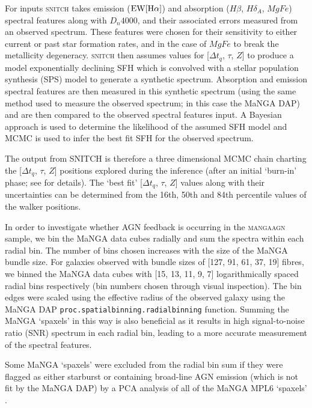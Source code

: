 \documentclass[useAMS,usenatbib]{mn2e}
\begin{document}
For inputs \textsc{snitch} takes emission ($\rm{EW}[H\alpha]$) and absorption ($H\beta$, $H\delta_A$, $MgFe$) spectral features along with $D_n4000$, and their associated errors measured from an observed spectrum. These features were chosen for their sensitivity to either current or past star formation rates, and in the case of $MgFe$ to break the metallicity degeneracy. \textsc{snitch} then assumes values for [$\Delta t_q$, $\tau$, $Z$] to produce a model exponentially declining SFH which is convolved with a stellar population synthesis (SPS) model to generate a synthetic spectrum. Absorption and emission spectral features are then measured in this synthetic spectrum (using the same method used to measure the observed spectrum; in this case the MaNGA DAP) and are then compared to the observed spectral features input. A Bayesian approach is used to determine the likelihood of the assumed SFH model and MCMC is used to infer the best fit SFH for the observed spectrum.
 
The output from \textsc{SNITCH} is therefore a three dimensional MCMC chain charting the [$\Delta t_q$, $\tau$, $Z$] positions explored during the inference (after an initial `burn-in' phase; see \citep{smethurst19a} for details). The ‘best fit’ [$\Delta t_q$, $\tau$, $Z$] values along with their uncertainties can be determined from the 16th, 50th and 84th percentile values of the walker positions.

In order to investigate whether AGN feedback is occurring in the \textsc{mangaagn} sample, we bin the MaNGA data cubes radially and sum the spectra within each radial bin. The number of bins chosen increases with the size of the MaNGA bundle size. For galaxies observed with bundle sizes of [127, 91, 61, 37, 19] fibres, we binned the MaNGA data cubes with [15, 13, 11, 9, 7] logarithmically spaced radial bins respectively (bin numbers chosen through visual inspection). The bin edges were scaled using the effective radius of the observed galaxy using the MaNGA DAP \texttt{proc.spatialbinning.radialbinning} function. Summing the MaNGA `spaxels' in this way is also beneficial as it results in high signal-to-noise ratio (SNR) spectrum in each radial bin, leading to a more accurate measurement of the spectral features. 

Some MaNGA `spaxels' were excluded from the radial bin sum if they were flagged as either starburst or containing broad-line AGN emission (which is not fit by the MaNGA DAP) by a PCA analysis of all of the MaNGA MPL6 `spaxels' \citep{rowlands18}. 
\end{document}
